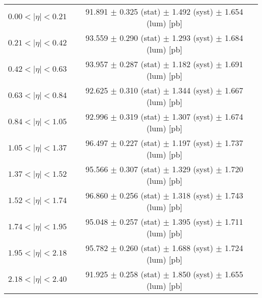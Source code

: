 \begin{tabular}{lc}
\hline
$0.00 < |\eta| <0.21$          & 91.891 $\pm$ 0.325 (stat) $\pm$ 1.492 (syst) $\pm$ 1.654 (lum) [pb]  \\
$0.21 < |\eta| <0.42$          & 93.559 $\pm$ 0.290 (stat) $\pm$ 1.293 (syst) $\pm$ 1.684 (lum) [pb]  \\
$0.42 < |\eta| <0.63$          & 93.957 $\pm$ 0.287 (stat) $\pm$ 1.182 (syst) $\pm$ 1.691 (lum) [pb]  \\
$0.63 < |\eta| <0.84$          & 92.625 $\pm$ 0.310 (stat) $\pm$ 1.344 (syst) $\pm$ 1.667 (lum) [pb]  \\
$0.84 < |\eta| <1.05$          & 92.996 $\pm$ 0.319 (stat) $\pm$ 1.307 (syst) $\pm$ 1.674 (lum) [pb]  \\
$1.05 < |\eta| <1.37$          & 96.497 $\pm$ 0.227 (stat) $\pm$ 1.197 (syst) $\pm$ 1.737 (lum) [pb]  \\
$1.37 < |\eta| <1.52$          & 95.566 $\pm$ 0.307 (stat) $\pm$ 1.329 (syst) $\pm$ 1.720 (lum) [pb]  \\
$1.52 < |\eta| <1.74$          & 96.860 $\pm$ 0.256 (stat) $\pm$ 1.318 (syst) $\pm$ 1.743 (lum) [pb]  \\
$1.74 < |\eta| <1.95$          & 95.048 $\pm$ 0.257 (stat) $\pm$ 1.395 (syst) $\pm$ 1.711 (lum) [pb]  \\
$1.95 < |\eta| <2.18$          & 95.782 $\pm$ 0.260 (stat) $\pm$ 1.688 (syst) $\pm$ 1.724 (lum) [pb]  \\
$2.18 < |\eta| <2.40$          & 91.925 $\pm$ 0.258 (stat) $\pm$ 1.850 (syst) $\pm$ 1.655 (lum) [pb]  \\
\hline
\end{tabular}
